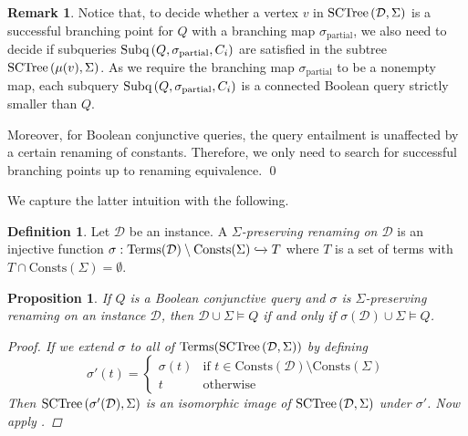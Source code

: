\documentclass[12pt]{report}
\theoremstyle{plain}
\newtheorem{proposition}[theorem]{Proposition}
\theoremstyle{definition}
\newtheorem{definition}[theorem]{Definition}
\newtheorem{remark}[theorem]{Remark}
\def\Consts{{\mathrm{Consts}}}
\def\Terms{{\mathrm{Terms}}}
\newcommand{\SCTree}[2]{\ensuremath{\normalfont{\textrm{SCTree}} \left( #1, #2 \right)}}
\newcommand{\Subq}[3]{\ensuremath{\normalfont{\textrm{Subq}} \left( #1, #2, #3 \right)}}
\begin{document}
\begin{remark}
\label{remark-towards-query-answering-procedure}
  Notice that, to decide whether a vertex $v$ in $\SCTree{\mathcal{D}}{\Sigma}$ is a successful branching point for $Q$ with a branching map $\sigma_\mathrm{partial}$, we also need to decide if subqueries $\Subq{Q}{\sigma_\mathrm{partial}}{C_i}$ are satisfied in the subtree $\SCTree{\mu(v)}{\Sigma}$. As we require the branching map $\sigma_\mathrm{partial}$ to be a nonempty map, each subquery $\Subq{Q}{\sigma_\mathrm{partial}}{C_i}$ is a connected Boolean query strictly smaller than $Q$.

  Moreover, for Boolean conjunctive queries, the query entailment is unaffected by a certain renaming of constants. Therefore, we only need to search for successful branching points up to renaming equivalence.
  \qed
\end{remark}

We capture the latter intuition with the following.

\begin{definition}
  Let $\mathcal{D}$ be an instance. A \emph{$\Sigma$-preserving renaming on $\mathcal{D}$} is an injective function $\sigma: \Terms(\mathcal{D}) \setminus \Consts(\Sigma) \xhookrightarrow{} T$ where $T$ is a set of terms with $T \cap \Consts(\Sigma) = \emptyset$.
\end{definition}

\begin{proposition}
\label{bcq-invariant-under-sigma-preserving-renaming}
  If $Q$ is a Boolean conjunctive query and $\sigma$ is $\Sigma$-preserving renaming on an instance $\mathcal{D}$, then $\mathcal{D} \cup \Sigma \models Q$ if and only if $\sigma(\mathcal{D}) \cup \Sigma \models Q$.
  \begin{proof}
    If we extend $\sigma$ to all of $\Terms(\SCTree{\mathcal{D}}{\Sigma})$ by defining $$\sigma'(t) =
    \begin{cases}
      \sigma(t) & \text{if } t \in \Consts(\mathcal{D}) \setminus \Consts(\Sigma) \\
      t & \text{otherwise}
    \end{cases}$$
    Then $\SCTree{\sigma'(\mathcal{D})}{\Sigma}$ is an isomorphic image of $\SCTree{\mathcal{D}}{\Sigma}$ under $\sigma'$. Now apply .
  \end{proof}
\end{proposition}
\end{document}
